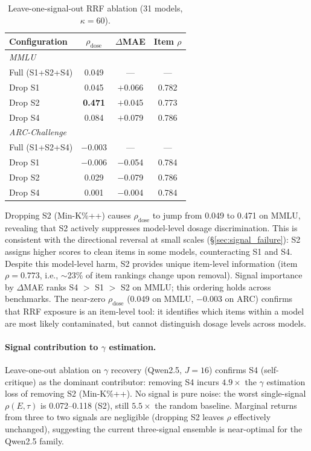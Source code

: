 \begin{table}[h]
\centering
\caption{Leave-one-signal-out RRF ablation (31 models, $\kappa\!=\!60$).}
\label{tab:rrf_ablation}
\footnotesize
\begin{tabular}{lccc}
\toprule
Configuration & $\rho_{\text{dose}}$ & $\Delta$MAE & Item $\rho$ \\
\midrule
\multicolumn{4}{l}{\textit{MMLU}} \\
Full (S1+S2+S4) & 0.049 & --- & --- \\
Drop S1 & 0.045 & $+$0.066 & 0.782 \\
Drop S2 & \textbf{0.471} & $+$0.045 & 0.773 \\
Drop S4 & 0.084 & $+$0.079 & 0.786 \\
\midrule
\multicolumn{4}{l}{\textit{ARC-Challenge}} \\
Full (S1+S2+S4) & $-$0.003 & --- & --- \\
Drop S1 & $-$0.006 & $-$0.054 & 0.784 \\
Drop S2 & 0.029 & $-$0.079 & 0.786 \\
Drop S4 & 0.001 & $-$0.004 & 0.784 \\
\bottomrule
\end{tabular}
\end{table}

Dropping S2 (Min-K\%++) causes $\rho_{\text{dose}}$ to jump from 0.049 to 0.471 on MMLU, revealing that S2 actively suppresses model-level dosage discrimination. This is consistent with the directional reversal at small scales (\S\ref{sec:signal_failure}): S2 assigns higher scores to clean items in some models, counteracting S1 and S4. Despite this model-level harm, S2 provides unique item-level information (item~$\rho = 0.773$, i.e., ${\sim}$23\% of item rankings change upon removal). Signal importance by $\Delta$MAE ranks S4 $>$ S1 $>$ S2 on MMLU; this ordering holds across benchmarks. The near-zero $\rho_{\text{dose}}$ (0.049 on MMLU, $-$0.003 on ARC) confirms that RRF exposure is an item-level tool: it identifies which items within a model are most likely contaminated, but cannot distinguish dosage levels across models.

\paragraph{Signal contribution to $\gamma$ estimation.}
Leave-one-out ablation on $\gamma$ recovery (Qwen2.5, $J=16$) confirms S4 (self-critique) as the dominant contributor: removing S4 incurs $4.9\times$ the $\gamma$ estimation loss of removing S2 (Min-K\%++). No signal is pure noise: the worst single-signal $\rho(E,\tau)$ is 0.072--0.118 (S2), still $5.5\times$ the random baseline. Marginal returns from three to two signals are negligible (dropping S2 leaves $\rho$ effectively unchanged), suggesting the current three-signal ensemble is near-optimal for the Qwen2.5 family.

